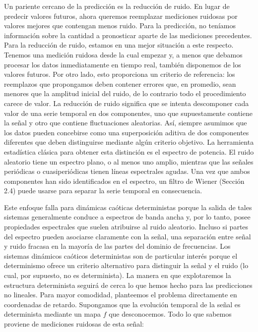 \documentclass[10pt,a4paper]{book}
\begin{document}
Un pariente cercano de la predicción es la reducción de ruido. En lugar de predecir valores futuros, ahora queremos reemplazar mediciones ruidosas por valores mejores que contengan menos ruido. Para la predicción, no teníamos información sobre la cantidad a pronosticar aparte de las mediciones precedentes. Para la reducción de ruido, estamos en una mejor situación a este respecto. Tenemos una medición ruidosa desde la cual empezar y, a menos que debamos procesar los datos inmediatamente en tiempo real, también disponemos de los valores futuros. Por otro lado, esto proporciona un criterio de referencia: los reemplazos que propongamos deben contener errores que, en promedio, sean menores que la amplitud inicial del ruido, de lo contrario todo el procedimiento carece de valor. La reducción de ruido significa que se intenta descomponer cada valor de una serie temporal en dos componentes, uno que supuestamente contiene la señal y otro que contiene fluctuaciones aleatorias. Así, siempre asumimos que los datos pueden concebirse como una superposición aditiva de dos componentes diferentes que deben distinguirse mediante algún criterio objetivo. La herramienta estadística clásica para obtener esta distinción es el espectro de potencia. El ruido aleatorio tiene un espectro plano, o al menos uno amplio, mientras que las señales periódicas o cuasiperiódicas tienen líneas espectrales agudas. Una vez que ambos componentes han sido identificados en el espectro, un filtro de Wiener (Sección 2.4) puede usarse para separar la serie temporal en consecuencia.

\bigskip

Este enfoque falla para dinámicas caóticas deterministas porque la salida de tales sistemas generalmente conduce a espectros de banda ancha y, por lo tanto, posee propiedades espectrales que suelen atribuirse al ruido aleatorio. Incluso si partes del espectro pueden asociarse claramente con la señal, una separación entre señal y ruido fracasa en la mayoría de las partes del dominio de frecuencias. Los sistemas dinámicos caóticos deterministas son de particular interés porque el determinismo ofrece un criterio alternativo para distinguir la señal y el ruido (lo cual, por supuesto, no es determinista). La manera en que explotaremos la estructura determinista seguirá de cerca lo que hemos hecho para las predicciones no lineales. Para mayor comodidad, planteemos el problema directamente en coordenadas de retardo. Supongamos que la evolución temporal de la señal es determinista mediante un mapa $f$ que desconocemos. Todo lo que sabemos proviene de mediciones ruidosas de esta señal:  
\end{document}
